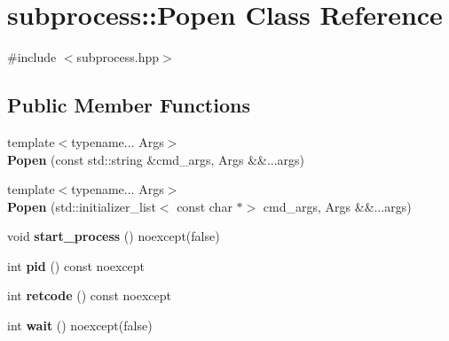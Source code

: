 \hypertarget{classsubprocess_1_1Popen}{}\section{subprocess\+:\+:Popen Class Reference}
\label{classsubprocess_1_1Popen}


{\ttfamily \#include $<$subprocess.\+hpp$>$}

\subsection*{Public Member Functions}
\begin{DoxyCompactItemize}
\item 
\mbox{\label{classsubprocess_1_1Popen_ae711851250d87fe74a21cab8f45f877e}} 
{\footnotesize template$<$typename... Args$>$ }\\{\bfseries Popen} (const std\+::string \&cmd\+\_\+args, Args \&\&...args)
\item 
\mbox{\label{classsubprocess_1_1Popen_a6e1abcc106ea93b1c54a81dbea169de0}} 
{\footnotesize template$<$typename... Args$>$ }\\{\bfseries Popen} (std\+::initializer\+\_\+list$<$ const char $\ast$$>$ cmd\+\_\+args, Args \&\&...args)
\item 
\mbox{\label{classsubprocess_1_1Popen_ac571c78a0364eacb0b2e20fed2629531}} 
void {\bfseries start\+\_\+process} () noexcept(false)
\item 
\mbox{\label{classsubprocess_1_1Popen_a9ed4bd65e9ea75c6e6577966d00acf62}} 
int {\bfseries pid} () const noexcept
\item 
\mbox{\label{classsubprocess_1_1Popen_aca0573a1e2928bd516b94a0b940a058c}} 
int {\bfseries retcode} () const noexcept
\item 
\mbox{\label{classsubprocess_1_1Popen_aea2bb56549420a2e2bd1877aa58e9841}} 
int {\bfseries wait} () noexcept(false)
\item 
\mbox{\label{classsubprocess_1_1Popen_afc1ab51f48d844534e04886336e51003}} 
$$
\end{DoxyCompactItemize}

